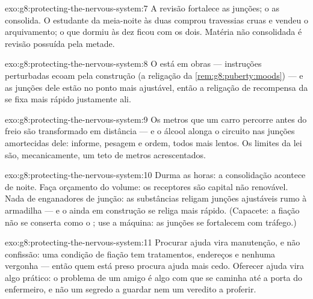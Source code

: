 \begin{solution}{exo:g8:protecting-the-nervous-system:7}
A revisão fortalece as junções; o  as consolida. O estudante da
meia-noite às duas comprou travessias cruas e vendeu o arquivamento; o
que dormiu às dez ficou com os dois. Matéria não consolidada é revisão
possuída pela metade.
\end{solution}

\begin{solution}{exo:g8:protecting-the-nervous-system:8}
O   está em obras --- instruções perturbadas ecoam
pela construção (a religação da \cref{rem:g8:puberty:moods}) --- e as
junções dele estão no ponto mais ajustável, então a religação de
recompensa da  se fixa mais rápido justamente ali.
\end{solution}

\begin{solution}{exo:g8:protecting-the-nervous-system:9}
Os metros que um carro percorre antes do freio são 
transformado em distância --- e o álcool alonga o circuito nas junções
amortecidas dele: informe, pesagem e ordem, todos mais lentos. Os
limites da lei são, mecanicamente, um teto de metros acrescentados.
\end{solution}

\begin{solution}{exo:g8:protecting-the-nervous-system:10}
Durma as horas: a consolidação acontece de noite. Faça orçamento do
volume: os receptores são capital não renovável. Nada de enganadores
de junção: as substâncias religam junções ajustáveis rumo à armadilha
--- e o  ainda em construção se religa mais rápido. (Capacete: a
fiação não se conserta como o ; use a máquina: as junções se
fortalecem com tráfego.)
\end{solution}

\begin{solution}{exo:g8:protecting-the-nervous-system:11}
Procurar ajuda vira manutenção, e não confissão: uma condição de
fiação tem tratamentos, endereços e nenhuma vergonha --- então quem
está preso procura ajuda mais cedo. Oferecer ajuda vira algo prático:
o problema de um amigo é algo com que se caminha até a porta do
enfermeiro, e não um segredo a guardar nem um veredito a proferir.
\end{solution}

